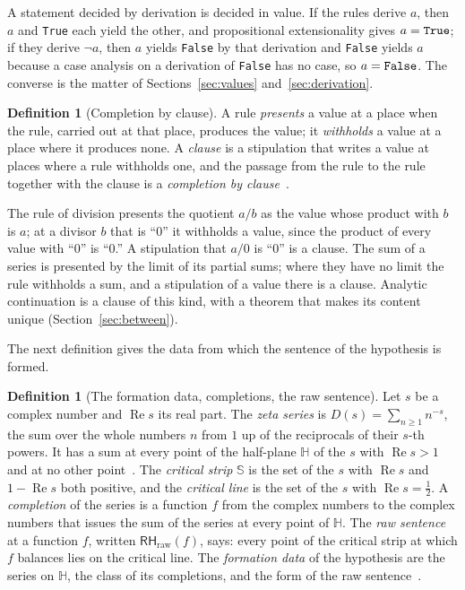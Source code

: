 \documentclass[11pt]{article}
\theoremstyle{definition}
\newtheorem{definition}[theorem]{Definition}
\theoremstyle{remark}
\newcommand{\re}{\operatorname{Re}}
\newcommand{\RHraw}{\mathsf{RH}_{\mathrm{raw}}}
\newcommand{\Hp}{\mathbb H}
\newcommand{\St}{\mathbb S}
\DeclareRobustCommand{\lean}[1]{{\renewcommand{\_}{\textunderscore\allowbreak}\texttt{#1}}}
\newcommand{\True}{\lean{True}}
\newcommand{\False}{\lean{False}}
\begin{document}
A statement decided by derivation is decided in value. If the rules derive $a$, then $a$ and \True{} each yield the other, and propositional extensionality gives $a=\True$; if they derive $\neg a$, then $a$ yields \False{} by that derivation and \False{} yields $a$ because a case analysis on a derivation of \False{} has no case, so $a=\False$. The converse is the matter of Sections~\ref{sec:values} and~\ref{sec:derivation}.

\begin{definition}[Completion by clause]\label{def:clause}
A rule \emph{presents} a value at a place when the rule, carried out at that place, produces the value; it \emph{withholds} a value at a place where it produces none. A \emph{clause} is a stipulation that writes a value at places where a rule withholds one, and the passage from the rule to the rule together with the clause is a \emph{completion by clause}~\citep{tv}.
\end{definition}

\noindent The rule of division presents the quotient $a/b$ as the value whose product with $b$ is $a$; at a divisor $b$ that is ``0'' it withholds a value, since the product of every value with ``0'' is ``0.'' A stipulation that $a/0$ is ``0'' is a clause. The sum of a series is presented by the limit of its partial sums; where they have no limit the rule withholds a sum, and a stipulation of a value there is a clause. Analytic continuation is a clause of this kind, with a theorem that makes its content unique (Section~\ref{sec:between}).

\noindent The next definition gives the data from which the sentence of the hypothesis is formed.

\begin{definition}[The formation data, completions, the raw sentence]\label{def:formation}
Let $s$ be a complex number and $\re s$ its real part. The \emph{zeta series} is $D(s)=\sum_{n\ge1}n^{-s}$, the sum over the whole numbers $n$ from $1$ up of the reciprocals of their $s$-th powers. It has a sum at every point of the half-plane $\Hp$ of the $s$ with $\re s>1$ and at no other point~\citep[ch.~II]{hardyriesz}. The \emph{critical strip} $\St$ is the set of the $s$ with $\re s$ and $1-\re s$ both positive, and the \emph{critical line} is the set of the $s$ with $\re s=\tfrac12$. A \emph{completion} of the series is a function $f$ from the complex numbers to the complex numbers that issues the sum of the series at every point of $\Hp$. The \emph{raw sentence} at a function $f$, written $\RHraw(f)$, says: every point of the critical strip at which $f$ balances lies on the critical line. The \emph{formation data} of the hypothesis are the series on $\Hp$, the class of its completions, and the form of the raw sentence~\citep{tv}.
\end{definition}
\end{document}
